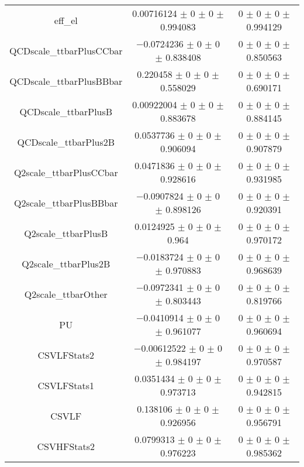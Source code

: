 \begin{table}
\begin{tabular}{ccc}
eff\_el & \num{0.00716124} $\pm$ \num{0} $\pm$ \num{0} $\pm$ \num{0.994083} & \num{0} $\pm$ \num{0} $\pm$ \num{0} $\pm$ \num{0.994129}\\
QCDscale\_ttbarPlusCCbar & \num{-0.0724236} $\pm$ \num{0} $\pm$ \num{0} $\pm$ \num{0.838408} & \num{0} $\pm$ \num{0} $\pm$ \num{0} $\pm$ \num{0.850563}\\
QCDscale\_ttbarPlusBBbar & \num{0.220458} $\pm$ \num{0} $\pm$ \num{0} $\pm$ \num{0.558029} & \num{0} $\pm$ \num{0} $\pm$ \num{0} $\pm$ \num{0.690171}\\
QCDscale\_ttbarPlusB & \num{0.00922004} $\pm$ \num{0} $\pm$ \num{0} $\pm$ \num{0.883678} & \num{0} $\pm$ \num{0} $\pm$ \num{0} $\pm$ \num{0.884145}\\
QCDscale\_ttbarPlus2B & \num{0.0537736} $\pm$ \num{0} $\pm$ \num{0} $\pm$ \num{0.906094} & \num{0} $\pm$ \num{0} $\pm$ \num{0} $\pm$ \num{0.907879}\\
Q2scale\_ttbarPlusCCbar & \num{0.0471836} $\pm$ \num{0} $\pm$ \num{0} $\pm$ \num{0.928616} & \num{0} $\pm$ \num{0} $\pm$ \num{0} $\pm$ \num{0.931985}\\
Q2scale\_ttbarPlusBBbar & \num{-0.0907824} $\pm$ \num{0} $\pm$ \num{0} $\pm$ \num{0.898126} & \num{0} $\pm$ \num{0} $\pm$ \num{0} $\pm$ \num{0.920391}\\
Q2scale\_ttbarPlusB & \num{0.0124925} $\pm$ \num{0} $\pm$ \num{0} $\pm$ \num{0.964} & \num{0} $\pm$ \num{0} $\pm$ \num{0} $\pm$ \num{0.970172}\\
Q2scale\_ttbarPlus2B & \num{-0.0183724} $\pm$ \num{0} $\pm$ \num{0} $\pm$ \num{0.970883} & \num{0} $\pm$ \num{0} $\pm$ \num{0} $\pm$ \num{0.968639}\\
Q2scale\_ttbarOther & \num{-0.0972341} $\pm$ \num{0} $\pm$ \num{0} $\pm$ \num{0.803443} & \num{0} $\pm$ \num{0} $\pm$ \num{0} $\pm$ \num{0.819766}\\
PU & \num{-0.0410914} $\pm$ \num{0} $\pm$ \num{0} $\pm$ \num{0.961077} & \num{0} $\pm$ \num{0} $\pm$ \num{0} $\pm$ \num{0.960694}\\
CSVLFStats2 & \num{-0.00612522} $\pm$ \num{0} $\pm$ \num{0} $\pm$ \num{0.984197} & \num{0} $\pm$ \num{0} $\pm$ \num{0} $\pm$ \num{0.970587}\\
CSVLFStats1 & \num{0.0351434} $\pm$ \num{0} $\pm$ \num{0} $\pm$ \num{0.973713} & \num{0} $\pm$ \num{0} $\pm$ \num{0} $\pm$ \num{0.942815}\\
CSVLF & \num{0.138106} $\pm$ \num{0} $\pm$ \num{0} $\pm$ \num{0.926956} & \num{0} $\pm$ \num{0} $\pm$ \num{0} $\pm$ \num{0.956791}\\
CSVHFStats2 & \num{0.0799313} $\pm$ \num{0} $\pm$ \num{0} $\pm$ \num{0.976223} & \num{0} $\pm$ \num{0} $\pm$ \num{0} $\pm$ \num{0.985362}\\

\end{tabular}
\end{table}
